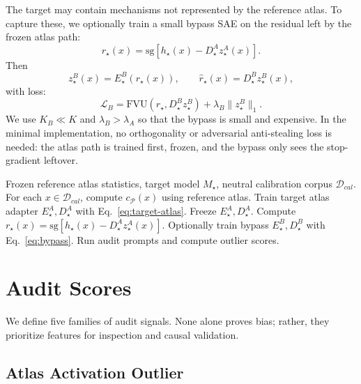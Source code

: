\documentclass[11pt]{article}
\newcommand{\panel}{\mathcal{P}}
\newcommand{\target}{M_\star}
\newcommand{\fvu}{\mathrm{FVU}}
\newcommand{\sg}{\mathrm{sg}}
\begin{document}
The target may contain mechanisms not represented by the reference atlas. To capture these, we optionally train a small bypass SAE on the residual left by the frozen atlas path:
\begin{equation}
    r_\star(x)=\sg\left[h_\star(x)-D_\star^A z_\star^A(x)\right].
\end{equation}
Then
\begin{equation}
    z_\star^B(x)=E_\star^B(r_\star(x)), \qquad \hat r_\star(x)=D_\star^B z_\star^B(x),
\end{equation}
with loss:
\begin{equation}
\boxed{
    \mathcal{L}_{B}
    = \fvu(r_\star,D_\star^B z_\star^B)
    + \lambda_B\|z_\star^B\|_1.
}
\label{eq:bypass}
\end{equation}
We use $K_B \ll K$ and $\lambda_B>\lambda_A$ so that the bypass is small and expensive. In the minimal implementation, no orthogonality or adversarial anti-stealing loss is needed: the atlas path is trained first, frozen, and the bypass only sees the stop-gradient leftover.

\begin{algorithm}[t]
\caption{Target Model Audit Adaptation}
\label{alg:target}
\begin{algorithmic}[1]
\REQUIRE Frozen reference atlas statistics, target model $\target$, neutral calibration corpus $\mathcal{D}_{cal}$.
\STATE For each $x\in\mathcal{D}_{cal}$, compute $c_{\panel}(x)$ using reference atlas.
\STATE Train target atlas adapter $E_\star^A,D_\star^A$ with Eq.~\ref{eq:target-atlas}.
\STATE Freeze $E_\star^A,D_\star^A$.
\STATE Compute $r_\star(x)=\sg[h_\star(x)-D_\star^A z_\star^A(x)]$.
\STATE Optionally train bypass $E_\star^B,D_\star^B$ with Eq.~\ref{eq:bypass}.
\STATE Run audit prompts and compute outlier scores.
\end{algorithmic}
\end{algorithm}

\section{Audit Scores}

We define five families of audit signals. None alone proves bias; rather, they prioritize features for inspection and causal validation.

\subsection{Atlas Activation Outlier}
\end{document}
